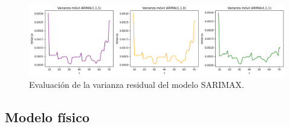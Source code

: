 \begin{figure}[H]
    \centering
    \includegraphics[width=0.6\linewidth]{figuras/varianza_ARIMA.png}
    \caption{Evaluación de la varianza residual del modelo SARIMAX.}
    \label{fig:varianaza-label}
\end{figure}


%
%
\subsection{Modelo físico}
%
%
